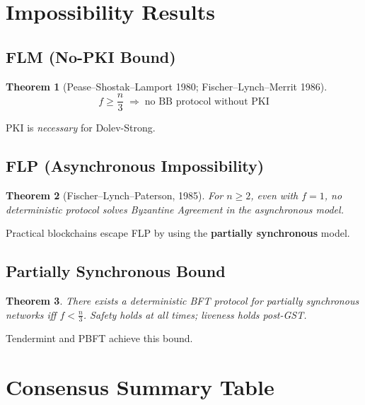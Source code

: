 \documentclass[12pt,a4paper,openany]{book}
\theoremstyle{definition}
\theoremstyle{plain}
\newtheorem{theorem}{Theorem}[chapter]
\theoremstyle{remark}
\begin{document}
\section{Impossibility Results}

\subsection{FLM (No-PKI Bound)}

\begin{theorem}[Pease--Shostak--Lamport 1980; Fischer--Lynch--Merrit 1986]
  \[
    \boxed{f\geq\frac{n}{3}
    \;\Rightarrow\;
    \text{no BB protocol without PKI}}
  \]
\end{theorem}

PKI is \emph{necessary} for Dolev-Strong.

\subsection{FLP (Asynchronous Impossibility)}

\begin{theorem}[Fischer--Lynch--Paterson, 1985]
  For $n\geq 2$, even with $f=1$, no \emph{deterministic} protocol
  solves Byzantine Agreement in the asynchronous model.
\end{theorem}

Practical blockchains escape FLP by using the \textbf{partially
synchronous} model.

\subsection{Partially Synchronous Bound}

\begin{theorem}
  There exists a deterministic BFT protocol for partially synchronous
  networks iff $f<\frac{n}{3}$.
  Safety holds at all times; liveness holds post-GST.
\end{theorem}

Tendermint and PBFT achieve this bound.

\section{Consensus Summary Table}
\end{document}
